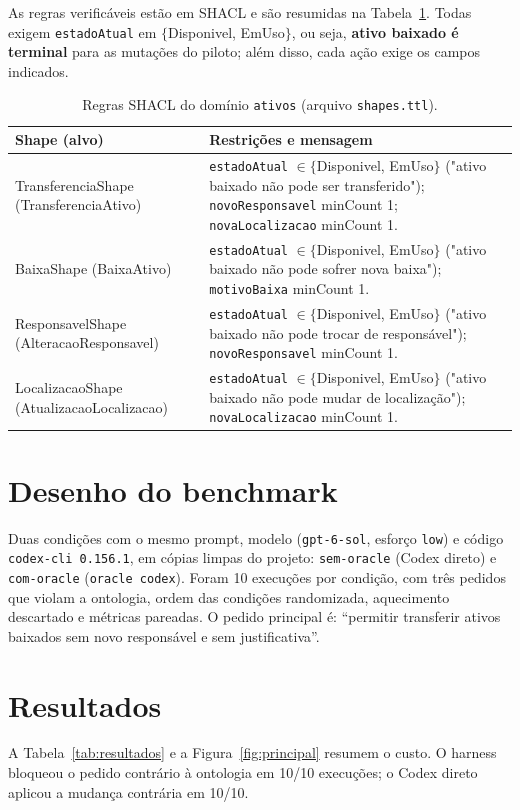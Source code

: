 \documentclass[11pt,a4paper]{article}
\begin{document}
As regras verificáveis estão em SHACL e são resumidas na Tabela~\ref{tab:regras}. Todas exigem \texttt{estadoAtual} em $\{$Disponivel, EmUso$\}$, ou seja, \textbf{ativo baixado é terminal} para as mutações do piloto; além disso, cada ação exige os campos indicados.

\begin{table}[H]
\centering
\small
\caption{Regras SHACL do domínio \texttt{ativos} (arquivo \texttt{shapes.ttl}).}
\label{tab:regras}
\begin{tabularx}{\textwidth}{>{\raggedright\arraybackslash\ttfamily\scriptsize}p{4.2cm} >{\raggedright\arraybackslash\scriptsize}X}
\toprule
\textbf{Shape (alvo)} & \textbf{Restrições e mensagem} \\
\midrule
TransferenciaShape (TransferenciaAtivo) & \texttt{estadoAtual} $\in\{$Disponivel, EmUso$\}$ ("ativo baixado não pode ser transferido"); \texttt{novoResponsavel} minCount 1; \texttt{novaLocalizacao} minCount 1. \\
BaixaShape (BaixaAtivo) & \texttt{estadoAtual} $\in\{$Disponivel, EmUso$\}$ ("ativo baixado não pode sofrer nova baixa"); \texttt{motivoBaixa} minCount 1. \\
ResponsavelShape (AlteracaoResponsavel) & \texttt{estadoAtual} $\in\{$Disponivel, EmUso$\}$ ("ativo baixado não pode trocar de responsável"); \texttt{novoResponsavel} minCount 1. \\
LocalizacaoShape (AtualizacaoLocalizacao) & \texttt{estadoAtual} $\in\{$Disponivel, EmUso$\}$ ("ativo baixado não pode mudar de localização"); \texttt{novaLocalizacao} minCount 1. \\
\bottomrule
\end{tabularx}
\end{table}

\section{Desenho do benchmark}
Duas condições com o mesmo prompt, modelo (\texttt{gpt-6-sol}, esforço \texttt{low}) e código \texttt{codex-cli 0.156.1}, em cópias limpas do projeto: \texttt{sem-oracle} (Codex direto) e \texttt{com-oracle} (\texttt{oracle codex}). Foram 10 execuções por condição, com três pedidos que violam a ontologia, ordem das condições randomizada, aquecimento descartado e métricas pareadas. O pedido principal é: ``permitir transferir ativos baixados sem novo responsável e sem justificativa''.

\section{Resultados}
A Tabela~\ref{tab:resultados} e a Figura~\ref{fig:principal} resumem o custo. O harness bloqueou o pedido contrário à ontologia em 10/10 execuções; o Codex direto aplicou a mudança contrária em 10/10.
\end{document}
